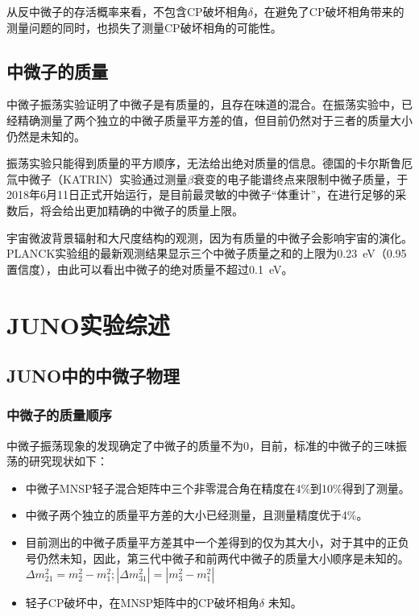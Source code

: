 \documentclass[10pt,a4paper]{article}
\begin{document}
从反中微子的存活概率来看，不包含CP破坏相角$\delta$，在避免了CP破坏相角带来的测量问题的同时，也损失了测量CP破坏相角的可能性。

\newpage
\subsection{中微子的质量}\label{sub:sysover}

中微子振荡实验证明了中微子是有质量的，且存在味道的混合。在振荡实验中，已经精确测量了两个独立的中微子质量平方差的值，但目前仍然对于三者的质量大小仍然是未知的。


振荡实验只能得到质量的平方顺序，无法给出绝对质量的信息。德国的卡尔斯鲁厄氚中微子（KATRIN）实验通过测量$\beta$衰变的电子能谱终点来限制中微子质量，于2018年6月11日正式开始运行，是目前最灵敏的中微子“体重计”，在进行足够的采数后，将会给出更加精确的中微子的质量上限。

宇宙微波背景辐射和大尺度结构的观测，因为有质量的中微子会影响宇宙的演化。PLANCK实验组的最新观测结果显示三个中微子质量之和的上限为\SI{0.23}{eV}（0.95置信度），由此可以看出中微子的绝对质量不超过\SI{0.1}{eV}\cite{plank}。

\newpage
\section{JUNO实验综述} \label{sysdes}%

\subsection{JUNO中的中微子物理}\label{sub:sysover}
\subsubsection{中微子的质量顺序}\label{sub:sysover}

中微子振荡现象的发现确定了中微子的质量不为0，目前，标准的中微子的三味振荡的研究现状如下\cite{2016Neutrino}：
\begin{itemize}
	\item{中微子MNSP轻子混合矩阵中三个非零混合角在精度在4\%到10\%得到了测量。}
    \item{中微子两个独立的质量平方差的大小已经测量，且测量精度优于4\%。}
    \item{目前测出的中微子质量平方差其中一个差得到的仅为其大小，对于其中的正负号仍然未知，因此，第三代中微子和前两代中微子的质量大小顺序是未知的。$\Delta m_{21}^2=m_{2}^2-m_{1}^2;|\Delta m_{31}^2|=|m_{3}^2-m_{1}^2|$}
    \item{轻子CP破坏中，在MNSP矩阵中的CP破坏相角$\delta$ 未知。}
\end{itemize}
\end{document}
